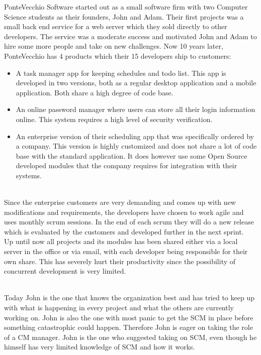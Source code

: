 \documentclass{article}
\begin{document}
\noindent PonteVecchio Software started out as a small software firm with two Computer Science students as their founders, John and Adam. Their first projects was a small back end service for a web server which they sold directly to other developers. The service was a moderate success and motivated John and Adam to hire some more people and take on new challenges. Now 10 years later, PonteVecchio has 4 products which their 15 developers ship to customers:
\begin{itemize}
\item A task manager app for keeping schedules and todo list. This app is developed in two versions, both as a regular desktop application and a mobile application. Both share a high degree of code base. 
\item An online password manager where users can store all their login information online. This system requires a high level of security verification.
\item An enterprise version of their scheduling app that was specifically ordered by a company. This version is highly customized and does not share a lot of code base with the standard application. It does however use some Open Source developed modules that the company requires for integration with their systems. 
\end{itemize}
\mbox{} \\

\noindent Since the enterprise customers are very demanding and comes up with new modifications and requirements, the developers have chosen to work agile and uses monthly scrum sessions. In the end of each scrum they will do a new release which is evaluated by the customers and developed further in the next sprint.
\mbox{} \\

\noindent Up until now all projects and its modules has been shared either via a local server in the office or via email, with each developer being responsible for their own share. This has severely hurt their productivity since the possibility of concurrent development is very limited. 

\mbox{} \\
Today John is the one that knows the organization best and has tried to keep up with what is happening in every project and what the others are currently working on. John is also the one with most panic to get the SCM in place before something catastrophic could happen. Therefore John is eager on taking the role of a CM manager. John is the one who suggested taking on SCM, even though he himself has very limited knowledge of SCM and how it works.
\end{document}
